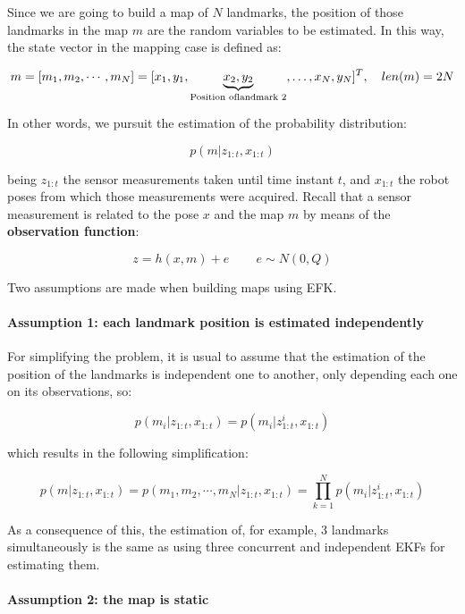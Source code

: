 \documentclass[11pt]{article}
\begin{document}
Since we are going to build a map of \(N\) landmarks, the position of
those landmarks in the map \(m\) are the random variables to be
estimated. In this way, the state vector in the mapping case is defined
as:

\[m = [m_1, m_2, \cdots, m_N] = 
[x_1, y_1, \underbrace{x_2, y_2}_{\text{Position of}\\\text{landmark 2}}, \dots,x_N, y_N]^T, \ \ \ len(m) = 2N\]

In other words, we pursuit the estimation of the probability
distribution:

\[p(m | z_{1:t}, x_{1:t})\]

being \(z_{1:t}\) the sensor measurements taken until time instant
\(t\), and \(x_{1:t}\) the robot poses from which those measurements
were acquired. Recall that a sensor measurement is related to the pose
\(x\) and the map \(m\) by means of the \textbf{observation function}:

\[z = h(x,m) + e \, \, \, \, \, \, \, \, \, \, \, \, \, e \sim N(0,Q)\]

Two assumptions are made when building maps using EFK.

\hypertarget{assumption-1-each-landmark-position-is-estimated-independently}{%
\paragraph{Assumption 1: each landmark position is estimated
independently}\label{assumption-1-each-landmark-position-is-estimated-independently}}

For simplifying the problem, it is usual to assume that the estimation
of the position of the landmarks is independent one to another, only
depending each one on its observations, so:

\[p(m_i|z_{1:t}, x_{1:t}) = p(m_i |z^i_{1:t}, x_{1:t})\]

which results in the following simplification:

\[p(m | z_{1:t}, x_{1:t})= p(m_1, m_2, \cdots, m_N | z_{1:t}, x_{1:t}) = \prod_{k=1}^N p(m_i | z^i_{1:t}, x_{1:t})\]

As a consequence of this, the estimation of, for example, 3 landmarks
simultaneously is the same as using three concurrent and independent
EKFs for estimating them.

\hypertarget{assumption-2-the-map-is-static}{%
\paragraph{Assumption 2: the map is
static}\label{assumption-2-the-map-is-static}}
\end{document}
